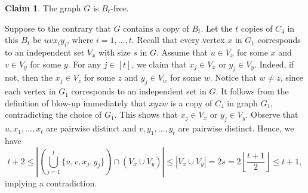 \documentclass[11pt,a4paper]{article}
\theoremstyle{definition}
\newtheorem{claimthm}{Claim}[section]
\newenvironment{claimproof}
  {\renewcommand{\qedsymbol}{\ensuremath{\blacksquare}}\proof}
  {\endproof}
  {\endproof}
\newcommand{\floor}[1]{\left\lfloor #1 \right\rfloor}
\begin{document}
        \begin{claimthm}\label{cla: 201}
            The graph $G$ is $B_t$-free.
        \end{claimthm}
        \begin{claimproof}
            Suppose to the contrary that $G$ contains a copy of $B_t$.
        Let the $t$ copies of $C_4$ in this $B_t$ be $u v x_i y_i$, where $i = 1, \dots, t$.
        Recall that every vertex $x$ in $G_1$ corresponds to an independent set $V_x$ with size $s$ in $G$.
        Assume that $u \in V_x$ for some $x$ and $v \in V_y$ for some $y$.
        For any $j \in [t]$, we claim that $x_j \in V_x$ or $y_j \in V_y$.
        Indeed, if not, then the $x_j \in V_z$ for some $z$ and $y_j \in V_w$ for some $w$.
        Notice that $w \neq z$, since each vertex in $G_1$ corresponds to an independent set in $G$.
        It follows from the definition of blow-up immediately that $x y z w$ is a copy of $C_4$ in graph $G_1$, contradicting the choice of $G_1$. This shows that $x_j \in V_x$ or $y_j \in V_y$. Observe that $u, x_1, \dots, x_t$ are pairwise distinct and $v, y_1, \dots, y_t$ are pairwise distinct. Hence, we have
        \begin{equation*}
            t+2\le\left|\left(\bigcup_{j=1}^t \{u, v, x_j, y_j\}\right)\cap(V_x\cup V_y)\right|\le |V_x\cup V_y|=2s=2\floor{\frac{t+1}{2}}\le t+1,
        \end{equation*}
        implying a contradiction.
        \end{claimproof}
        
\end{document}
